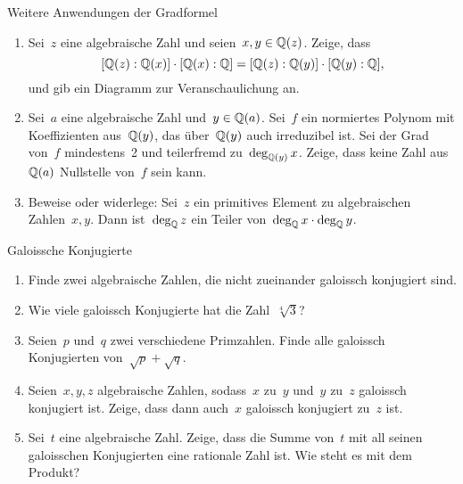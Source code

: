 \documentclass{algblatt}
\begin{document}
\vspace*{-1.5cm}


\begin{aufgabe}{Weitere Anwendungen der Gradformel}
\begin{enumerate}
\item Sei~$z$ eine algebraische Zahl und seien~$x, y \in \mathbb{Q}(z)$. Zeige, dass
\[ [\mathbb{Q}(z):\mathbb{Q}(x)] \cdot [\mathbb{Q}(x):\mathbb{Q}] = [\mathbb{Q}(z):\mathbb{Q}(y)] \cdot
[\mathbb{Q}(y):\mathbb{Q}], \]
und gib ein Diagramm zur Veranschaulichung an.
\item Sei~$a$ eine algebraische Zahl und~$y \in \mathbb{Q}(a)$. Sei~$f$ ein normiertes
Polynom mit Koeffizienten aus~$\mathbb{Q}(y)$, das über~$\mathbb{Q}(y)$ auch
irreduzibel ist. Sei der Grad von~$f$ mindestens~2 und teilerfremd
zu~$\deg_{\mathbb{Q}(y)} x$. Zeige, dass keine Zahl aus~$\mathbb{Q}(a)$ Nullstelle von~$f$
sein kann.

\item Beweise oder widerlege: Sei~$z$ ein primitives Element zu algebraischen
Zahlen~$x, y$. Dann ist~$\deg_{\mathbb{Q}} z$ ein Teiler von~$\deg_{\mathbb{Q}} x \cdot \deg_{\mathbb{Q}}
y$.
\end{enumerate}
\end{aufgabe}

\begin{aufgabe}{Galoissche Konjugierte}
\begin{enumerate}
\item Finde zwei algebraische Zahlen, die nicht zueinander galoissch konjugiert
sind.
\item Wie viele galoissch Konjugierte hat die Zahl~$\sqrt[4]{3}$?
\item Seien~$p$ und~$q$ zwei verschiedene Primzahlen. Finde alle
galoissch Konjugierten von~$\sqrt{p} + \sqrt{q}$.
\item Seien~$x, y, z$ algebraische Zahlen, sodass~$x$ zu~$y$ und~$y$ zu~$z$
galoissch konjugiert ist. Zeige, dass dann auch~$x$ galoissch konjugiert zu~$z$
ist.
\item Sei~$t$ eine algebraische Zahl. Zeige, dass die Summe von~$t$ mit all
seinen galoisschen Konjugierten eine rationale Zahl ist. Wie steht es mit dem
Produkt?
\end{enumerate}
\end{aufgabe}
\end{document}

